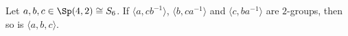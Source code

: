 Let $a,b,c\in\Sp(4,2)\cong S_6$. If $\langle a,cb^{-1}\rangle$, $\langle b,ca^{-1}\rangle$ and $\langle c,ba^{-1}\rangle$ are $2$-groups, then so is $\langle a,b,c\rangle$.
